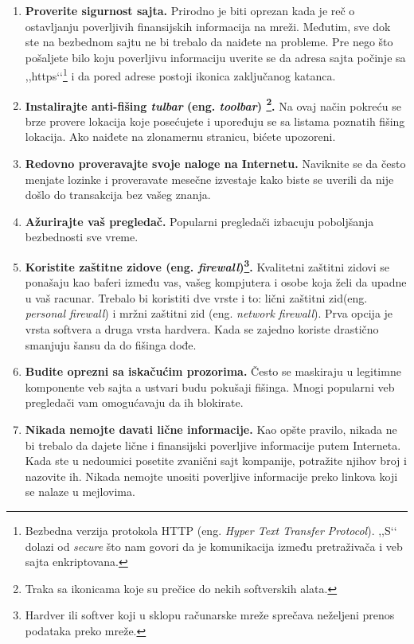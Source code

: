 \documentclass[a4paper]{article}
\theoremstyle{break}
\begin{document}
{\begin{enumerate}
\item \textbf{Proverite sigurnost sajta.} Prirodno je biti oprezan kada je reč o ostavljanju poverljivih finansijskih informacija na mreži. Međutim, sve dok ste na bezbednom sajtu ne bi trebalo da naiđete na probleme. Pre nego što pošaljete bilo koju poverljivu informaciju uverite se da adresa sajta počinje sa ,,https‘‘\footnote{Bezbedna verzija protokola HTTP (eng. {\em Hyper Text Transfer Protocol}). ,,S‘‘ dolazi od \textit{secure} što nam govori da je komunikacija između pretraživača i veb sajta enkriptovana.} i da pored adrese postoji ikonica zaključanog katanca.

\item \textbf{Instalirajte anti-fišing \textit{tulbar} (eng. {\em toolbar}) \footnote{Traka sa ikonicama koje su prečice do nekih softverskih alata.}.} Na ovaj način pokreću se brze provere lokacija koje posećujete i upoređuju se sa listama poznatih fišing lokacija. Ako naiđete na zlonamernu stranicu, bićete upozoreni.

\item \textbf{Redovno proveravajte svoje naloge na Internetu.} Naviknite se da često menjate lozinke i proveravate mesečne izvestaje kako biste se uverili da nije došlo do transakcija bez vašeg znanja.

\item \textbf{Ažurirajte vaš pregledač.} Popularni pregledači izbacuju poboljšanja bezbednosti sve vreme.

\item \textbf{Koristite zaštitne zidove (eng. {\em firewall})\footnote{Hardver ili softver koji u sklopu računarske mreže sprečava neželjeni prenos podataka preko mreže.}.} Kvalitetni zaštitni zidovi se ponašaju kao baferi između vas, vašeg kompjutera i osobe koja želi da upadne u vaš racunar. Trebalo bi koristiti dve vrste i to: lični zaštitni zid(eng. {\em personal firewall}) i mržni zaštitni zid (eng. {\em network firewall}). Prva opcija je vrsta softvera a druga vrsta hardvera. Kada se zajedno koriste drastično smanjuju šansu da do fišinga dođe.

\item \textbf{Budite oprezni sa iskačućim prozorima.} Često se maskiraju u legitimne komponente veb sajta a ustvari budu pokušaji fišinga. Mnogi popularni veb pregledači vam omogućavaju da ih blokirate.

\item \textbf{Nikada nemojte davati lične informacije.} Kao opšte pravilo, nikada ne bi trebalo da dajete lične i finansijski poverljive informacije putem Interneta. Kada ste u nedoumici posetite zvanični sajt kompanije, potražite njihov broj i nazovite ih. Nikada nemojte unositi poverljive informacije preko linkova koji se nalaze u mejlovima.


\end{enumerate}}
\end{document}
